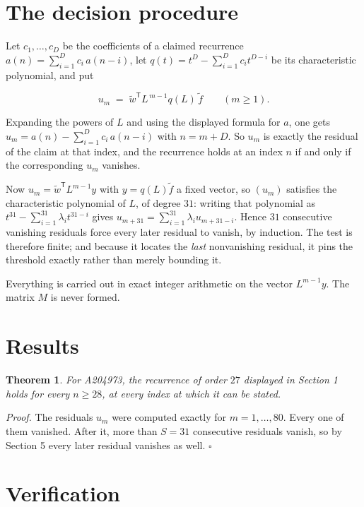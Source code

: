 \documentclass[11pt]{article}
\newtheorem{theorem}{Theorem}
\theoremstyle{definition}
\begin{document}
\section{The decision procedure}

Let $c_1,\dots,c_D$ be the coefficients of a claimed recurrence $a(n) = \sum_{i=1}^{D} c_i\,a(n-i)$, let $q(t) = t^{D} - \sum_{i=1}^{D} c_i t^{D-i}$ be its characteristic polynomial, and put

\[u_m \;=\; \tilde w^{\mathsf T} L^{\,m-1} q(L)\,\tilde f \qquad (m \ge 1).\]

Expanding the powers of $L$ and using the displayed formula for $a$, one gets $u_m = a(n) - \sum_{i=1}^{D} c_i\,a(n-i)$ with $n = m + D$. So $u_m$ is exactly the residual of the claim at that index, and the recurrence holds at an index $n$ if and only if the corresponding $u_m$ vanishes.

Now $u_m = \tilde w^{\mathsf T} L^{m-1} y$ with $y = q(L)\tilde f$ a fixed vector, so $(u_m)$ satisfies the characteristic polynomial of $L$, of degree $31$: writing that polynomial as $t^{31} - \sum_{i=1}^{31} \lambda_i t^{31-i}$ gives $u_{m+31} = \sum_{i=1}^{31} \lambda_i u_{m+31-i}$. Hence $31$ consecutive vanishing residuals force every later residual to vanish, by induction. The test is therefore finite; and because it locates the {\itshape last} nonvanishing residual, it pins the threshold exactly rather than merely bounding it.

Everything is carried out in exact integer arithmetic on the vector $L^{m-1}y$. The matrix $M$ is never formed.

\section{Results}

\begin{theorem} For A204973, the recurrence of order $27$ displayed in Section 1 holds for every $n \ge 28$, at every index at which it can be stated.\end{theorem}

{\itshape Proof.} The residuals $u_m$ were computed exactly for $m = 1,\dots,80$. Every one of them vanished. After it, more than $S = 31$ consecutive residuals vanish, so by Section 5 every later residual vanishes as well. $\square$

\section{Verification}
\end{document}
